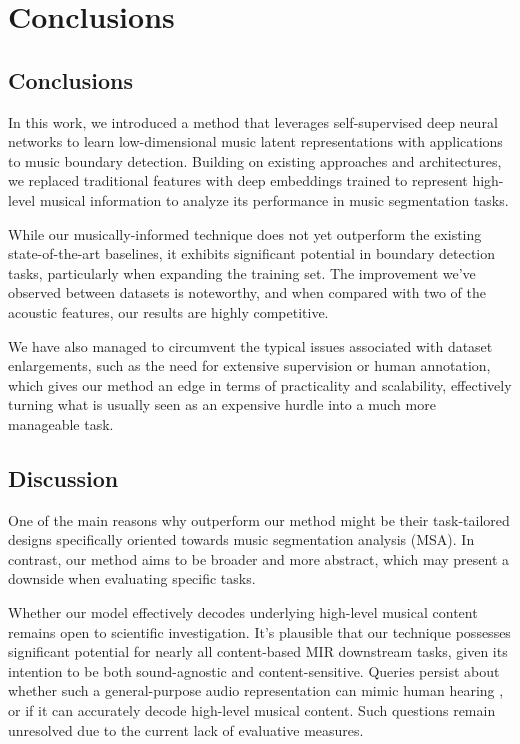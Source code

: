 \chapter{Conclusions}

\section{Conclusions}

In this work, we introduced a method that leverages self-supervised deep neural networks to learn low-dimensional music latent representations with applications to music boundary detection. Building on existing approaches and architectures, we replaced traditional features with deep embeddings trained to represent high-level musical information to analyze its performance in music segmentation tasks.

While our musically-informed technique does not yet outperform the existing state-of-the-art baselines, it exhibits significant potential in boundary detection tasks, particularly when expanding the training set. The improvement we've observed between datasets is noteworthy, and when compared with two of the acoustic features, our results are highly competitive. 

We have also managed to circumvent the typical issues associated with dataset enlargements, such as the need for extensive supervision or human annotation, which gives our method an edge in terms of practicality and scalability, effectively turning what is usually seen as an expensive hurdle into a much more manageable task.

\section{Discussion}

One of the main reasons why \cite{deepfeaturesegment, SalamonDeepSegmentation} outperform our method might be their task-tailored designs specifically oriented towards music segmentation analysis (MSA). In contrast, our method aims to be broader and more abstract, which may present a downside when evaluating specific tasks.

Whether our model effectively decodes underlying high-level musical content remains open to scientific investigation. It's plausible that our technique possesses significant potential for nearly all content-based MIR downstream tasks, given its intention to be both sound-agnostic and content-sensitive. Queries persist about whether such a general-purpose audio representation can mimic human hearing \cite{Li2023MERT:Training, Turian2022HEAR:Representations}, or if it can accurately decode high-level musical content. Such questions remain unresolved due to the current lack of evaluative measures. 

